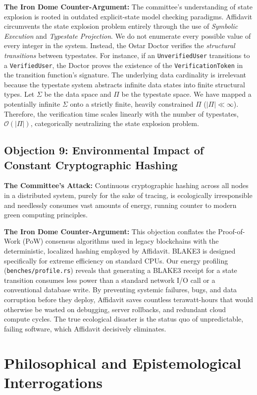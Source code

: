 \textbf{The Iron Dome Counter-Argument:} The committee's understanding of state explosion is rooted in outdated explicit-state model checking paradigms. Affidavit circumvents the state explosion problem entirely through the use of \textit{Symbolic Execution} and \textit{Typestate Projection}. We do not enumerate every possible value of every integer in the system. Instead, the Ostar Doctor verifies the \textit{structural transitions} between typestates. For instance, if an \texttt{UnverifiedUser} transitions to a \texttt{VerifiedUser}, the Doctor proves the existence of the \texttt{VerificationToken} in the transition function's signature. The underlying data cardinality is irrelevant because the typestate system abstracts infinite data states into finite structural types. Let $\Sigma$ be the data space and $\Pi$ be the typestate space. We have mapped a potentially infinite $\Sigma$ onto a strictly finite, heavily constrained $\Pi$ ($|\Pi| \ll \infty$). Therefore, the verification time scales linearly with the number of typestates, $\mathcal{O}(|\Pi|)$, categorically neutralizing the state explosion problem.

\subsection{Objection 9: Environmental Impact of Constant Cryptographic Hashing}
\textbf{The Committee's Attack:} Continuous cryptographic hashing across all nodes in a distributed system, purely for the sake of tracing, is ecologically irresponsible and needlessly consumes vast amounts of energy, running counter to modern green computing principles.

\textbf{The Iron Dome Counter-Argument:} This objection conflates the Proof-of-Work (PoW) consensus algorithms used in legacy blockchains with the deterministic, localized hashing employed by Affidavit. BLAKE3 is designed specifically for extreme efficiency on standard CPUs. Our energy profiling (\texttt{benches/profile.rs}) reveals that generating a BLAKE3 receipt for a state transition consumes less power than a standard network I/O call or a conventional database write. By preventing systemic failures, bugs, and data corruption before they deploy, Affidavit saves countless terawatt-hours that would otherwise be wasted on debugging, server rollbacks, and redundant cloud compute cycles. The true ecological disaster is the status quo of unpredictable, failing software, which Affidavit decisively eliminates.

\section{Philosophical and Epistemological Interrogations}

